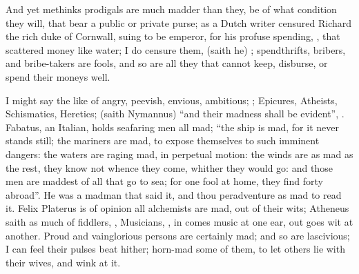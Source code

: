 
And yet methinks prodigals are much madder than they, be of what condition they
will, that bear a public or private purse; as a Dutch
writer censured Richard the rich duke of Cornwall, suing to be emperor, for his
profuse spending, , that scattered money like water; I do censure them,  (saith he) ; spendthrifts, bribers,
and bribe-takers are fools, and so are all they that cannot
keep, disburse, or spend their moneys well.

I might say the like of angry, peevish, envious, ambitious;
; Epicures, Atheists,
Schismatics, Heretics;  (saith
Nymannus) \enquote{and their madness shall be evident}, .
Fabatus, an Italian, holds seafaring men all mad; \enquote{the ship
is mad, for it never stands still; the mariners are mad, to expose themselves
to such imminent dangers: the waters are raging mad, in perpetual motion: the
winds are as mad as the rest, they know not whence they come, whither they
would go: and those men are maddest of all that go to sea; for one fool at
home, they find forty abroad}. He was a madman that said it, and thou
peradventure as mad to read it. Felix Platerus is of
opinion all alchemists are mad, out of their wits; Atheneus
saith as much of fiddlers, ,
Musicians, , in comes music at one ear, out goes wit at
another. Proud and vainglorious persons are certainly mad; and so are
lascivious; I can feel their pulses beat hither; horn-mad
some of them, to let others lie with their wives, and wink at it.


